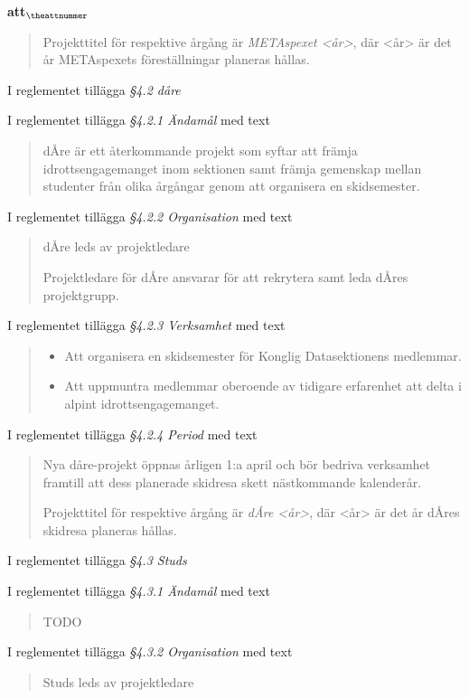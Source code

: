 \documentclass[a4paper]{article}
\begin{document}
\begin{list}{\bf att$_{\theattnummer}$}{}
\begin{quote}
        Projekttitel för respektive årgång är \textit{METAspexet <år>}, där <år> är det år METAspexets föreställningar planeras hållas.
    \end{quote}


\item I reglementet tillägga \textit{\S4.2 dåre}
\item I reglementet tillägga \textit{\S4.2.1 Ändamål} med text
    \begin{quote}
        dÅre är ett återkommande projekt som syftar att främja idrottsengagemanget inom sektionen samt främja gemenskap mellan studenter från olika årgångar genom att organisera en skidsemester.
    \end{quote}
\item I reglementet tillägga \textit{\S4.2.2 Organisation} med text
    \begin{quote}
        dÅre leds av projektledare

        Projektledare för dÅre ansvarar för att rekrytera samt leda dÅres projektgrupp.
    \end{quote}
\item I reglementet tillägga \textit{\S4.2.3 Verksamhet} med text
    \begin{quote}
        \begin{itemize}
            \item Att organisera en skidsemester för Konglig Datasektionens medlemmar.
            \item Att uppmuntra medlemmar oberoende av tidigare erfarenhet att delta i alpint idrottsengagemanget.
        \end{itemize}
    \end{quote}
\item I reglementet tillägga \textit{\S4.2.4 Period} med text
    \begin{quote}
        Nya dåre-projekt öppnas årligen 1:a april och bör bedriva verksamhet framtill att dess planerade skidresa skett nästkommande kalenderår.

        Projekttitel för respektive årgång är \textit{dÅre <år>}, där <år> är det år dÅres skidresa planeras hållas.
    \end{quote}


\item I reglementet tillägga \textit{\S4.3 Studs}
\item I reglementet tillägga \textit{\S4.3.1 Ändamål} med text
    \begin{quote}
        TODO
    \end{quote}
\item I reglementet tillägga \textit{\S4.3.2 Organisation} med text
    \begin{quote}
        Studs leds av projektledare


\end{quote}
\end{list}
\end{document}

